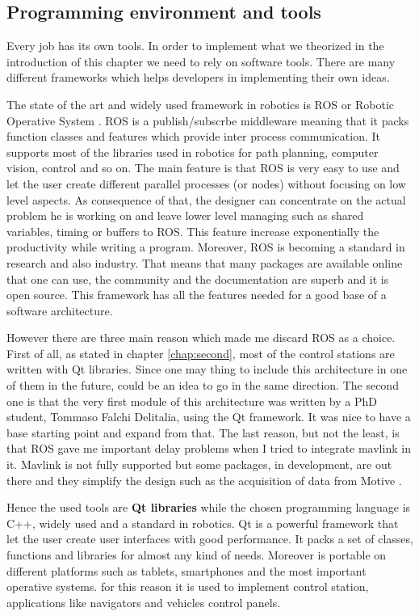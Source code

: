 \subsection{Programming environment and tools}

Every job has its own tools. In order to implement what we theorized in the introduction of this chapter we need to rely on software tools. There are many different frameworks which helps developers in implementing their own ideas.

 The state of the art and widely used framework in robotics is ROS or Robotic Operative System \cite{ROS}. ROS is a publish/subscrbe middleware meaning that it packs function classes and features which provide inter process communication. It supports most of the libraries used in robotics for path planning, computer vision, control and so on. The main feature is that ROS is very easy to use and let the user create different parallel processes (or nodes) without focusing on low level aspects. As consequence of that, the designer can concentrate on the actual problem he is working on and leave lower level managing such as shared variables, timing or buffers to ROS. This feature increase exponentially the productivity while writing a program. Moreover, ROS is becoming a standard in research and also industry. That means that many packages are available online that one can use, the community and the documentation are superb and it is open source. This framework has all the features needed for a good base of a software architecture.
 
 However there are three main reason which made me discard ROS as a choice. First of all, as stated in chapter \ref{chap:second}, most of the control stations are written with Qt libraries. Since one may thing to include this architecture in one of them in the future, could be an idea to go in the same direction. The second one is that the very first module of this architecture was written by a PhD student, Tommaso Falchi Delitalia, using the Qt framework. It was nice to have a base starting point and expand from that. The last reason, but not the least, is that ROS gave me important delay problems when I tried to integrate mavlink in it. Mavlink is not fully supported but some packages, in development, are out there and they simplify the design such as the acquisition of data from Motive \cite{optiros}.

Hence the used tools are \textbf{Qt libraries} \cite{qt} while the chosen programming language is C++, widely used and a standard in robotics. Qt is a powerful framework that let the user create user interfaces with good performance. It packs a set of classes, functions and libraries for almost any kind of needs. Moreover is portable on different platforms such as tablets, smartphones and the most important operative systems. for this reason it is used to implement control station, applications like navigators and vehicles control panels.

